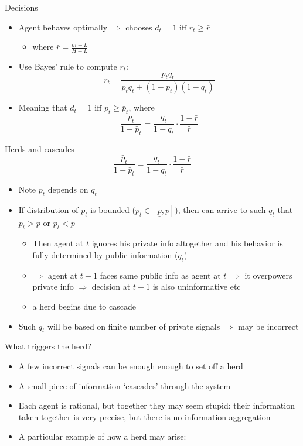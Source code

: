 \documentclass[english,10pt
,aspectratio=169
]{beamer}
\begin{document}
\begin{frame}{Decisions}
	\begin{itemize}
		\item Agent behaves optimally $\Rightarrow$ chooses $d_t=1$ iff $r_t \geq \bar{r}$
		\begin{itemize}
			\item where $\bar{r} = \frac{m-L}{H-L}$
		\end{itemize}
		\item Use Bayes' rule to compute $r_t$: 
		\[r_t = \frac{p_t q_t}{p_t q_t + (1-p_t) (1-q_t)}\]
		\item Meaning that $d_t = 1$ iff $p_t \geq \bar{p}_t$, where
		\[ \frac{\bar{p}_t}{1-\bar{p}_t} = \frac{q_t}{1-q_t} \cdot \frac{1-\bar{r}}{\bar{r}} \]
	\end{itemize}
\end{frame}


\begin{frame}{Herds and cascades}
	\[ \frac{\bar{p}_t}{1-\bar{p}_t} = \frac{q_t}{1-q_t} \cdot \frac{1-\bar{r}}{\bar{r}} \]
	\vspace{-1em}
	\begin{itemize}
		\item Note $\bar{p}_t$ depends on $q_t$
		\item If distribution of $p_t$ is bounded ($p_t \in [\underline{p},\bar{p}]$), then can arrive to such $q_t$ that $\bar{p}_t > \bar{p}$ or $\bar{p}_t < \underline{p}$
		\begin{itemize}
			\item Then agent at $t$ ignores his private info altogether and his behavior is fully determined by public information ($q_t$)
			\item $\Rightarrow$ agent at $t+1$ faces same public info as agent at $t$ $\Rightarrow$ it overpowers private info $\Rightarrow$ decision at $t+1$ is also uninformative etc
			\item a \alert{herd} begins due to cascade
		\end{itemize}
		\item Such $q_t$ will be based on finite number of private signals $\Rightarrow$ \alert{may be incorrect}
	\end{itemize}
\end{frame}


\begin{frame}{What triggers the herd?} \label{HERD}
	\begin{itemize}
		\item A few incorrect signals can be enough enough to set off a herd
		\item A small piece of information `cascades' through the system
		\item Each agent is rational, but together they may seem stupid: their information taken together is very precise, but there is no information aggregation
		\item A particular example of how a herd may arise: \hyperlink{EXP}{}
	\end{itemize}
\end{frame}
\end{document}
